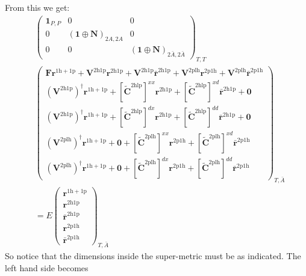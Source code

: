 From this we get:
\begin{align}
&
\begin{pmatrix}
\bm{1}_{P,P} & 0 & 0 \\
0 & \left(\bm{1} \oplus \bm{N}\right)_{2A,2A} & 0 \\
0 & 0 & \left(\bm{1} \oplus \bm{N}\right)_{2\bar{A},2\bar{A}}
\end{pmatrix}_{T,T} \\
&
\begin{pmatrix}
\bm{F}\bm{r}^{1\mathrm{h}+1\mathrm{p}} + \bm{V}^{2\mathrm{h}1\mathrm{p}}\bm{r}^{2\mathrm{h}1\mathrm{p}} + \bm{V}^{2\mathrm{h}1\mathrm{p}}\bm{\bar{r}}^{2\mathrm{h}1\mathrm{p}} + \bm{V}^{2\mathrm{plh}}\bm{r}^{2\mathrm{p}1\mathrm{h}} + \bm{V}^{2\mathrm{plh}}\bm{\bar{r}}^{2\mathrm{p}1\mathrm{h}} \\
\left(\bm{V}^{2\mathrm{h1p}}\right)^{\dagger} \bm{r}^{1\mathrm{h}+1\mathrm{p}} + [\bm{\tilde{C}}^{2\mathrm{hlp}}]^{xx} \bm{r}^{2\mathrm{h}1\mathrm{p}} + [\bm{\tilde{C}}^{2\mathrm{hlp}}]^{xd} \bm{\bar{r}}^{2\mathrm{h}1\mathrm{p}} + \bm{0} \\
\left(\bm{V}^{2\mathrm{h1p}}\right)^{\dagger} \bm{r}^{1\mathrm{h}+1\mathrm{p}} + [\bm{\tilde{C}}^{2\mathrm{hlp}}]^{dx} \bm{r}^{2\mathrm{h}1\mathrm{p}} + [\bm{\tilde{C}}^{2\mathrm{hlp}}]^{dd} \bm{\bar{r}}^{2\mathrm{h}1\mathrm{p}} + \bm{0} \\
\left(\bm{V}^{2\mathrm{plh}}\right)^{\dagger} \bm{r}^{1\mathrm{h}+1\mathrm{p}} + \bm{0} + [\bm{\tilde{C}}^{2\mathrm{plh}}]^{xx} \bm{r}^{2\mathrm{p}1\mathrm{h}} + [\bm{\tilde{C}}^{2\mathrm{plh}}]^{xd} \bm{\bar{r}}^{2\mathrm{p}1\mathrm{h}} \\
\left(\bm{V}^{2\mathrm{plh}}\right)^{\dagger} \bm{r}^{1\mathrm{h}+1\mathrm{p}} + \bm{0} + [\bm{\tilde{C}}^{2\mathrm{plh}}]^{dx} \bm{r}^{2\mathrm{p}1\mathrm{h}} + [\bm{\tilde{C}}^{2\mathrm{plh}}]^{dd} \bm{\bar{r}}^{2\mathrm{p}1\mathrm{h}}
\end{pmatrix}_{T,\bar{A}}\\ &= E
\begin{pmatrix}
\bm{r}^{1\mathrm{h}+1\mathrm{p}} \\
\bm{r}^{2\mathrm{h}1\mathrm{p}} \\
\bm{\bar{r}}^{2\mathrm{h}1\mathrm{p}} \\
\bm{r}^{2\mathrm{p}1\mathrm{h}} \\
\bm{\bar{r}}^{2\mathrm{p}1\mathrm{h}}
\end{pmatrix}_{T,\bar{A}}
\end{align}
So notice that the dimensions inside the super-metric must be as indicated. The left hand side becomes
